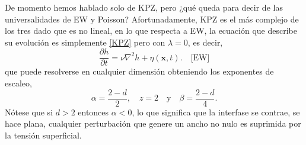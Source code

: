 De momento hemos hablado solo de KPZ, pero ¿qué queda para decir de las universalidades de EW y Poisson? Afortunadamente, KPZ es el más complejo de los tres dado que es no lineal, en lo que respecta a EW, la ecuación que describe su evolución es simplemente \ref{KPZ} pero con $\lambda=0$, es decir,
\begin{equation}
    \frac{\partial h}{\partial t} = \nu \nabla^2h + \eta(\mathbf{x},t). \quad \text{[EW]}
    \label{EW}
\end{equation}
que puede resolverse en cualquier dimensión obteniendo los exponentes de escaleo,
\begin{equation}
    \alpha = \frac{2-d}{2}, \quad z = 2 \quad \text{y} \quad \beta = \frac{2-d}{4}.
\end{equation}
Nótese que si $d>2$ entonces $\alpha<0$, lo que significa que la interfase se contrae, se hace plana, cualquier perturbación que genere un ancho no nulo es suprimida por la tensión superficial.

